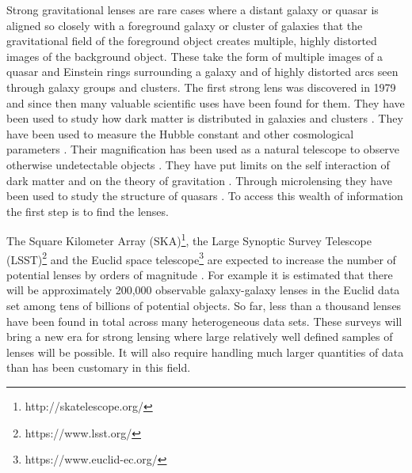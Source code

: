 \documentclass{aa}
\begin{document}
Strong gravitational lenses are rare cases where a distant galaxy or quasar is aligned so closely with a foreground galaxy or cluster of galaxies  that the gravitational field of the foreground object creates multiple, highly distorted images of the background object.  These take the form of multiple images of a quasar and Einstein rings surrounding a galaxy and of highly distorted arcs seen through galaxy groups and clusters.  The first strong lens was discovered in 1979 \citet{1979Natur.279..381W} and since then many valuable scientific uses have been found for them.  They have been used to study how dark matter is distributed in galaxies and clusters \citep[e.g.][]{1991ApJ...373..354K,2001ApJ...554.1216C,2002ApJ...568L...5K,2003ApJ...587..143R,2003ApJ...583..606K,2005MNRAS.360.1333W,2005ApJ...623...31D,2009MNRAS.392..945V,2016MNRAS.463.3115T}.  They have been used to measure the Hubble constant and other cosmological parameters 
\citep[e.g.][]{1964MNRAS.128..307R,1992ARAandA..30..311B,2000ApJ...544...98W,2013ApJ...766...70S,2016AandARv..24...11T}.  
Their magnification has been used as a natural telescope to observe otherwise undetectable objects \citep[e.g][]{2007ApJ...671.1196M,2017MNRAS.464.4823B,2016ApJ...833..264S}.   They have put limits on the self interaction of dark matter and on the theory of gravitation \citep{0004-637X-606-2-819}.  Through microlensing they have been used to study the structure of quasars \citep{2008ApJ...689..755M,2008ApJ...673...34P,2011ApJ...729...34B}.   To access this wealth of information the first step is to find the lenses.

The Square Kilometer Array (SKA)\footnote{http://skatelescope.org/}, the Large Synoptic Survey Telescope (LSST)\footnote{https://www.lsst.org/} and the Euclid space telescope\footnote{https://www.euclid-ec.org/} are expected to increase the number of potential lenses by orders of magnitude \citep{collett_15,euclidSLWGwhitepaper,2015aska.confE..84M,2010MNRAS.405.2579O}.   For example it is estimated that there will be approximately 200,000 observable galaxy-galaxy lenses in the Euclid data set among tens of billions of potential objects.  So far, less than a thousand lenses have been found in total across many heterogeneous data sets.  These surveys will bring a new era for strong lensing where large relatively well defined samples of lenses will be possible.  It will also require handling much larger quantities of data than has been customary in this field.
\end{document}

